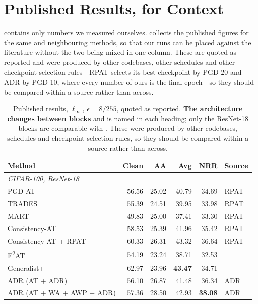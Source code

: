 \section{Published Results, for Context}
\label{app:published}

 contains only numbers we measured ourselves.  collects the
published figures for the same and neighbouring methods, so that our runs can be placed against the
literature without the two being mixed in one column. These are quoted as reported and were produced
by other codebases, other schedules and other checkpoint-selection rules---RPAT selects its best
checkpoint by PGD-20 and ADR by PGD-10, where every number of ours is the final epoch---so they should
be compared within a source rather than across.

\begin{table}[!htbp]
  \centering \small \setlength{\tabcolsep}{4.5pt}
  \caption{Published results, $\ell_\infty$, $\epsilon = 8/255$, quoted as reported. \textbf{The
  architecture changes between blocks} and is named in each heading; only the ResNet-18 blocks are
  comparable with . These were produced by other codebases, schedules and
  checkpoint-selection rules, so they should be compared within a source rather than across.}
  \label{tab:published}
  \begin{tabular}{lrrrrl}
    \toprule
    Method & Clean & AA & Avg & NRR & Source \\
    \midrule
    \multicolumn{6}{l}{\emph{CIFAR-100, ResNet-18}} \\
    PGD-AT                    & 56.56 & 25.02 & 40.79 & 34.69 & RPAT \\
    TRADES                    & 55.39 & 24.51 & 39.95 & 33.98 & RPAT \\
    MART                      & 49.83 & 25.00 & 37.41 & 33.30 & RPAT \\
    Consistency-AT            & 58.53 & 25.39 & 41.96 & 35.42 & RPAT \\
    Consistency-AT + RPAT     & 60.33 & 26.31 & 43.32 & 36.64 & RPAT \\
    F\textsuperscript{2}AT    & 54.19 & 23.24 & 38.71 & 32.53 & \citet{f2at} \\
    Generalist++              & 62.97 & 23.96 & \textbf{43.47} & 34.71 & \citet{generalist} \\
    ADR (AT + ADR)            & 56.10 & 26.87 & 41.48 & 36.34 & ADR \\
    ADR (AT + WA + AWP + ADR) & 57.36 & 28.50 & 42.93 & \textbf{38.08} & ADR \\

\end{tabular}
\end{table}
